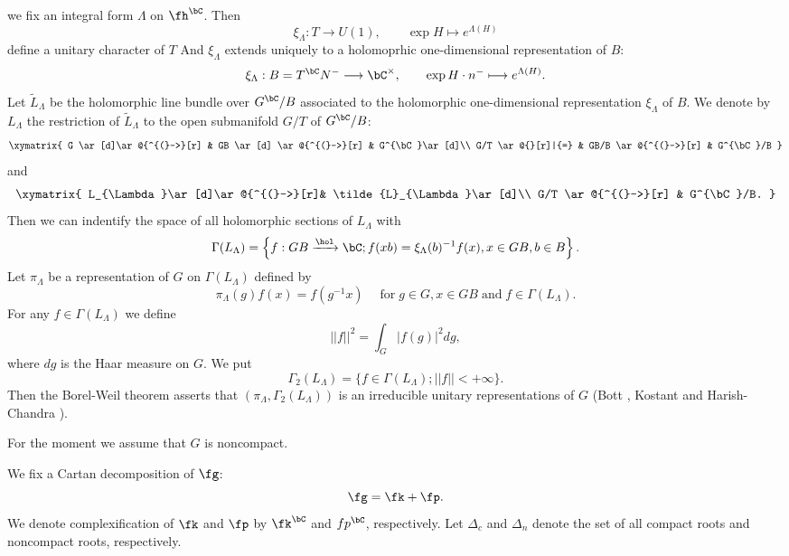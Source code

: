we fix an integral form $\Lambda$ on $\fh^{\bC}$. Then
$$
\xi_{\Lambda} : T \longrightarrow U(1), \qquad \exp H \longmapsto e^{\Lambda(H)} 
$$ 
define a unitary character of $T$ And $\xi_{\Lambda}$ extends uniquely to a holomoprhic one-dimensional representation of $B$:
$$
\xi_{\Lambda}: B = T^{\bC}N^{-} \longrightarrow \bC^{\times}, \qquad \exp H \cdot n^{-} \longmapsto e^{\Lambda(H)}.
$$
Let $\tilde{L}_{\Lambda}$ be the holomorphic line bundle over $G^{\bC}/B$ associated to the holomorphic one-dimensional representation $\xi_{\Lambda}$ of $B$. We denote by $L_{\Lambda}$ the restriction of $\tilde{L}_{\Lambda}$ to the open submanifold $G/T$ of $G^{\bC}/B$:
$$
\xymatrix{
G \ar[d]\ar@{^{(}->}[r] & GB \ar[d] \ar@{^{(}->}[r] & G^{\bC}\ar[d]\\
G/T \ar@{}[r]|{=} & GB/B \ar@{^{(}->}[r] & G^{\bC}/B
}
$$
and
$$
\xymatrix{
L_{\Lambda}\ar[d]\ar@{^{(}->}[r]& \tilde{L}_{\Lambda}\ar[d]\\
G/T \ar@{^{(}->}[r] & G^{\bC}/B.
}
$$
Then we can indentify the space of all holomorphic sections of $L_{\Lambda}$ with
$$
\Gamma(L_{\Lambda})= \left\{f : GB \xrightarrow{\hol}\bC ; f(xb) = \xi_{\Lambda}(b)^{-1}f(x), x \in GB, b\in B \right\}.
$$
Let $\pi_{\Lambda}$ be a representation of $G$ on $\Gamma(L_{\Lambda})$ defined by
$$
\pi_{\Lambda} (g)f(x)= f(g^{-1}x) \quad \;\text{for}\; g \in G, x \in GB\; \text{and}\; f \in \Gamma(L_{\Lambda}).
$$
For any $f \in \Gamma(L_{\Lambda})$ we define
$$
||f||^{2} = \int_{G} |f(g)|^{2}dg,
$$
where $dg$ is the Haar measure on $G$. We put
$$
\Gamma_{2}(L_{\Lambda})= \{f \in \Gamma (L_{\Lambda}); ||f|| < + \infty\}.
$$
Then the Borel-Weil theorem asserts that $(\pi_{\Lambda}, \Gamma_{2}(L_{\Lambda}))$ is an irreducible unitary representations of $G$ (Bott \cite{art15-key1}, Kostant \cite{art15-key8} and Harish-Chandra \cite{art15-key2} \cite{art15-key3} \cite{art15-key4}).

For the moment we assume that $G$ is noncompact.

We fix a Cartan decomposition of $\fg$:
$$
\fg = \fk + \fp.
$$
We denote complexification of $\fk$ and $\fp$ by $\fk^{\bC}$ and $fp^{\bC}$, respectively. Let $\Delta_{c}$ and $\Delta_{n}$ denote the set of all compact roots and noncompact roots, respectively.

